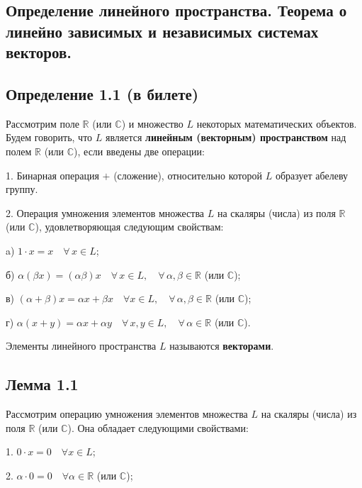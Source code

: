 {
\subsection{Определение линейного пространства. Теорема о линейно зависимых и независимых системах векторов.}

\subsection*{Определение 1.1 (в билете)}

Рассмотрим поле \( \mathbb{R} \) (или \( \mathbb{C} \)) и множество \( L \) некоторых математических объектов. Будем говорить, что \( L \) является \textbf{линейным (векторным) пространством} над полем \( \mathbb{R} \) (или \( \mathbb{C} \)), если введены две операции:

1. Бинарная операция \( + \) (сложение), относительно которой \( L \) образует абелеву группу.

2. Операция умножения элементов множества \( L \) на скаляры (числа) из поля \( \mathbb{R} \) (или \( \mathbb{C} \)), удовлетворяющая следующим свойствам:

   a) \( 1 \cdot x = x \quad \forall \, x \in L \);

   б) \( \alpha (\beta x) = (\alpha \beta) x \quad \forall \, x \in L, \quad \forall \, \alpha, \beta \in \mathbb{R} \) (или \( \mathbb{C} \));

   в) \( (\alpha + \beta) x = \alpha x + \beta x \quad \forall x \in L, \quad \forall \, \alpha, \beta \in \mathbb{R} \) (или \( \mathbb{C} \));

   г) \( \alpha (x + y) = \alpha x + \alpha y \quad \forall \, x, y \in L, \quad \forall \, \alpha \in \mathbb{R} \) (или \( \mathbb{C} \)).

Элементы линейного пространства \( L \) называются \textbf{векторами}.

\subsection*{Лемма 1.1}

Рассмотрим операцию умножения элементов множества \( L \) на скаляры (числа) из поля \( \mathbb{R} \) (или \( \mathbb{C} \)). Она обладает следующими свойствами:

1. \( 0 \cdot x = 0 \quad \forall x \in L \);

2. \( \alpha \cdot 0 = 0 \quad \forall \alpha \in \mathbb{R} \) (или \( \mathbb{C} \));

}
